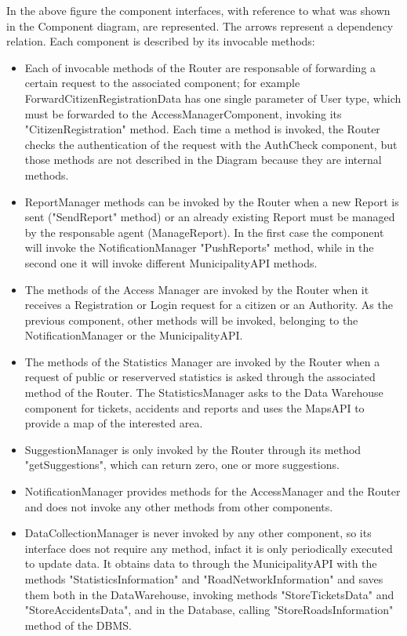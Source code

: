 \documentclass[a4paper]{report}
\begin{document}
In the above figure the component interfaces, with reference to what was shown in the Component diagram, are represented. The arrows represent a dependency relation. Each component is described by its invocable methods:
\begin{itemize}
\item Each of invocable methods of the Router are responsable of forwarding a certain request to the associated component; for example ForwardCitizenRegistrationData has one single parameter of User type, which must be forwarded to the AccessManagerComponent, invoking its "CitizenRegistration" method.
Each time a method is invoked, the Router checks the authentication of the request with the AuthCheck component, but those methods are not described in the Diagram because they are internal methods.
\item ReportManager methods can be invoked by the Router when a new Report is sent ("SendReport" method) or an already existing Report must be managed by the responsable agent (ManageReport). In the first case the component will invoke the NotificationManager "PushReports" method, while in the second one it will invoke different MunicipalityAPI methods.
\item The methods of the Access Manager are invoked by the Router when it receives a Registration or Login request for a citizen or an Authority. As the previous component, other methods will be invoked, belonging to the NotificationManager or the MunicipalityAPI.
\item The methods of the Statistics Manager are invoked by the Router when a request of public or reserverved statistics is asked through the associated method of the Router. The StatisticsManager asks to the Data Warehouse component for tickets, accidents and reports and uses the MapsAPI to provide a map of the interested area.
\item SuggestionManager is only invoked by the Router through its method "getSuggestions", which can return zero, one or more suggestions.
\item NotificationManager provides methods for the AccessManager and the Router and does not invoke any other methods from other components.
\item DataCollectionManager is never invoked by any other component, so its interface does not require any method, infact it is only periodically executed to update data. It obtains data to through the MunicipalityAPI with the methods "StatisticsInformation" and "RoadNetworkInformation" and saves them both in the DataWarehouse, invoking methods "StoreTicketsData" and "StoreAccidentsData", and in the Database, calling "StoreRoadsInformation" method of the DBMS.

\end{itemize}
\end{document}
